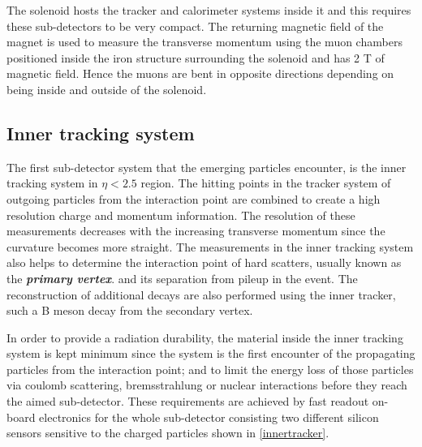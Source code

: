 The solenoid hosts the tracker and calorimeter systems inside it and this requires these sub-detectors to be very compact. The returning magnetic field of the magnet is used to measure the transverse momentum using the muon chambers positioned inside the iron structure surrounding the solenoid and has 2 T of magnetic field. Hence the muons are bent in opposite directions depending on being inside and outside of the solenoid.

\subsection{Inner tracking system}

The first sub-detector system that the emerging particles encounter, is the inner tracking system in $\eta < 2.5$ region. The hitting points in the tracker system of outgoing particles from the interaction point are combined to create a high resolution charge and momentum information. The resolution of these measurements decreases with the increasing transverse momentum since the curvature becomes more straight. The measurements in the inner tracking system also helps to determine the interaction point of hard scatters, usually known as the \textbf{\emph{primary vertex}}. and its separation from pileup in the event. The reconstruction of additional decays are also performed using the inner tracker, such a B meson decay from the secondary vertex.

In order to provide a radiation durability, the material inside the inner tracking system is kept minimum since the system is the first encounter of the propagating particles from the interaction point; and to limit the energy loss of those particles via coulomb scattering, bremsstrahlung or nuclear interactions before they reach the aimed sub-detector. These requirements are achieved by fast readout on-board electronics for the whole sub-detector consisting two different silicon sensors sensitive to the charged particles shown in \autoref{innertracker}.

